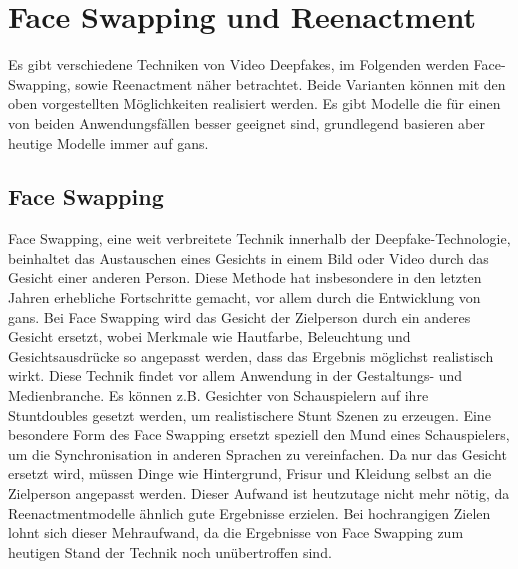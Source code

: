 \section{Face Swapping und Reenactment}\label{sec:face-swapping-und-reenactment}
Es gibt verschiedene Techniken von Video Deepfakes, im Folgenden werden Face-Swapping, sowie Reenactment näher betrachtet.
Beide Varianten können mit den oben vorgestellten Möglichkeiten realisiert werden.
Es gibt Modelle die für einen von beiden Anwendungsfällen besser geeignet sind, grundlegend basieren aber heutige Modelle immer auf \glspl{gan}.

\subsection*{Face Swapping}\label{subsec:face-swapping}
Face Swapping, eine weit verbreitete Technik innerhalb der Deepfake-Technologie, beinhaltet das Austauschen eines
Gesichts in einem Bild oder Video durch das Gesicht einer anderen Person.
Diese Methode hat insbesondere in den letzten Jahren erhebliche Fortschritte gemacht, vor allem durch die Entwicklung von \glspl{gan}.
Bei Face Swapping wird das Gesicht der Zielperson durch ein anderes Gesicht ersetzt, wobei Merkmale wie Hautfarbe,
Beleuchtung und Gesichtsausdrücke so angepasst werden, dass das Ergebnis möglichst realistisch wirkt.
Diese Technik findet vor allem Anwendung in der Gestaltungs- und Medienbranche.
Es können z.B. Gesichter von Schauspielern auf ihre Stuntdoubles gesetzt werden, um realistischere Stunt Szenen zu erzeugen.
Eine besondere Form des Face Swapping ersetzt speziell den Mund eines Schauspielers, um die Synchronisation in anderen Sprachen zu vereinfachen\cite{Deepfakes-An-Overview}.
Da nur das Gesicht ersetzt wird, müssen Dinge wie Hintergrund, Frisur und Kleidung selbst an die Zielperson angepasst werden.
Dieser Aufwand ist heutzutage nicht mehr nötig, da Reenactmentmodelle ähnlich gute Ergebnisse erzielen.
Bei hochrangigen Zielen lohnt sich dieser Mehraufwand, da die Ergebnisse von Face Swapping zum heutigen Stand der Technik noch unübertroffen sind.

